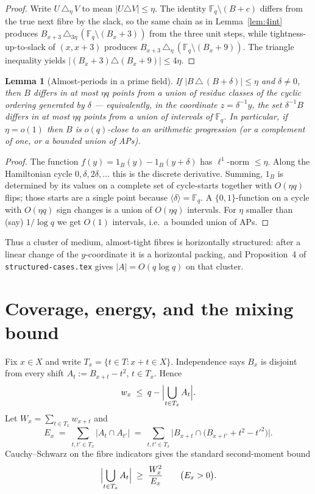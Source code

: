\documentclass[11pt]{article}
\newtheorem{lemma}[theorem]{Lemma}
\theoremstyle{definition}
\newcommand{\F}{\mathbb{F}}
\begin{document}
\begin{proof}
Write $U\,\triangle_{\eta}\,V$ to mean $|U\triangle V|\le\eta$.
The identity $\F_q\setminus(B+c)$ differs from the true next fibre by the slack, so the same chain as in Lemma~\ref{lem:4int} produces
$B_{x+3}\,\triangle_{3\eta}\,(\F_q\setminus(B_x+3))$
from the three unit steps, while tightness-up-to-slack of $(x,x+3)$ produces
$B_{x+3}\,\triangle_{\eta}\,(\F_q\setminus(B_x+9))$.
The triangle inequality yields $|(B_x+3)\triangle(B_x+9)|\le 4\eta$.
\end{proof}

\begin{lemma}[Almost-periods in a prime field]\label{lem:period}
If $|B\,\triangle\,(B+\delta)|\le\eta$ and $\delta\not=0$, then $B$ differs in at most $\eta q$ points from a union of residue classes of the cyclic ordering generated by $\delta$ --- equivalently, in the coordinate $z=\delta^{-1}y$, the set $\delta^{-1}B$ differs in at most $\eta q$ points from a union of intervals of $\F_q$.
In particular, if $\eta=o(1)$ then $B$ is $o(q)$-close to an arithmetic progression (or a complement of one, or a bounded union of APs).
\end{lemma}

\begin{proof}
The function $f(y)=1_B(y)-1_B(y+\delta)$ has $\ell^{1}$-norm $\le\eta$.
Along the Hamiltonian cycle $0,\delta,2\delta,\dots$ this is the discrete derivative.
Summing, $1_B$ is determined by its values on a complete set of cycle-starts together with $O(\eta q)$ flips; those starts are a single point because $\langle\delta\rangle=\F_q$.
A $\{0,1\}$-function on a cycle with $O(\eta q)$ sign changes is a union of $O(\eta q)$ intervals.
For $\eta$ smaller than (say) $1/\log q$ we get $O(1)$ intervals, i.e.\ a bounded union of APs.
\end{proof}

Thus a cluster of medium, almost-tight fibres is horizontally structured: after a linear change of the $y$-coordinate it is a horizontal packing, and Proposition~4 of \texttt{structured-cases.tex} gives $|A|=O(q\log q)$ on that cluster.

\section{Coverage, energy, and the mixing bound}

Fix $x\in X$ and write $T_x=\{t\in T:x+t\in X\}$.
Independence says $B_x$ is disjoint from every shift $A_t:=B_{x+t}-t^{2}$, $t\in T_x$.
Hence
\begin{equation}\label{eq:cover}
  w_x
  \;\le\;
  q-\Bigl|\bigcup_{t\in T_x}A_t\Bigr|.
\end{equation}
Let $W_x=\sum_{t\in T_x}w_{x+t}$ and
\[
  E_x
  \;=\;
  \sum_{t,t'\in T_x}
  \bigl|A_t\cap A_{t'}\bigr|
  \;=\;
  \sum_{t,t'\in T_x}
  \bigl|B_{x+t}\cap\bigl(B_{x+t'}+t^{2}-t'^{2}\bigr)\bigr|.
\]
Cauchy--Schwarz on the fibre indicators gives the standard second-moment bound
\begin{equation}\label{eq:CS}
  \Bigl|\bigcup_{t\in T_x}A_t\Bigr|
  \;\ge\;
  \frac{W_x^{2}}{E_x}
  \qquad\bigl(E_x>0\bigr).
\end{equation}
\end{document}
